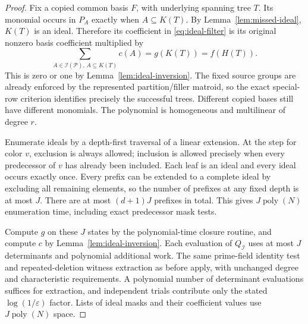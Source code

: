 \begin{proof}
Fix a copied common basis $F$, with underlying spanning tree $T$.  Its
monomial occurs in $P_A$ exactly when $A\subseteq K(T)$.  By
Lemma~\ref{lem:missed-ideal}, $K(T)$ is an ideal.  Therefore its coefficient
in \eqref{eq:ideal-filter} is its original nonzero basis coefficient
multiplied by
\[
       \sum_{A\in\mathcal I(\mathcal P),\,A\subseteq K(T)}c(A)
            =g(K(T))=f(H(T)).
\]
This is zero or one by Lemma~\ref{lem:ideal-inversion}.  The fixed source
groups are already enforced by the represented partition/filler matroid,
so the exact special-row criterion identifies precisely the successful
trees.  Different copied bases still have different monomials.  The
polynomial is homogeneous and multilinear of degree $r$.

Enumerate ideals by a depth-first traversal of a linear extension.
At the step for color $v$, exclusion is always allowed; inclusion is
allowed precisely when every predecessor of $v$ has already been included.
Each leaf is an ideal and every ideal occurs exactly once.  Every prefix
can be extended to a complete ideal by excluding all remaining elements,
so the number of prefixes at any fixed depth is at most $J$.  There are
at most $(d+1)J$ prefixes in total.  This gives
$J\operatorname{poly}(N)$ enumeration time, including exact predecessor
mask tests.

Compute $g$ on these $J$ states by the polynomial-time closure routine,
and compute $c$ by Lemma~\ref{lem:ideal-inversion}.  Each evaluation of
$Q_{\mathcal I}$ uses at most $J$ determinants and polynomial additional
work.  The same prime-field identity test and repeated-deletion witness
extraction as before apply, with unchanged degree and characteristic
requirements.  A polynomial number of determinant evaluations suffices
for extraction, and independent trials contribute only the stated
$\log(1/\varepsilon)$ factor.  Lists of ideal masks and their coefficient
values use $J\operatorname{poly}(N)$ space.
\end{proof}

